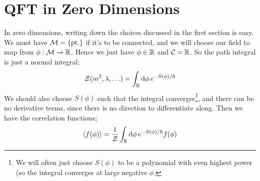 \section{QFT in Zero Dimensions}
In zero dimensions, writing down the choices discussed in the first section is easy. We must have $\mM = \set{\text{pt.}}$ if it's to be connected, and we will choose our field to map from $\phi : \mathcal{M} \rightarrow \mathbb{R}$. Hence we just have $\phi \in \mathbb{R}$ and $\mathcal{C} = \mathbb{R}$. So the path integral is just a normal integral;
\begin{equation}
\mathcal{Z}(m^2, \lambda, \ldots) = \int_{\mathbb{R}}{\text{d}\phi \, e^{-S(\phi)/\hbar}}
\end{equation}
We should also choose $S(\phi)$ such that the integral converges\footnote{We will often just choose $S(\phi)$ to be a polynomial with even highest power (so the integral converges at large negative $\phi$.}, and there can be no derivative terms, since there is no direction to differentiate along. Then we have the correlation functions;
\begin{equation}
\left< f(\phi) \right> = \frac{1}{\mZ}\int_{\RR}{\upd{\phi} e^{-S(\phi)/\hbar}f(\phi)}
\end{equation}
